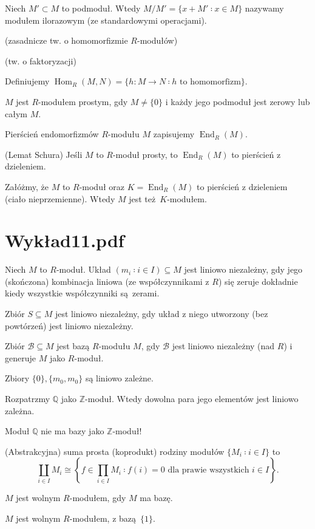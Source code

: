\documentclass[a4paper, 12pt]{article}
\DeclareMathOperator{\Hom}{Hom}
\DeclareMathOperator{\End}{End}
\newcommand{\+}{\enspace}
\begin{document}
Niech $M' ⊂ M$ to podmoduł.
Wtedy $M/M' = \{ x+M' ∶ x ∈ M \}$ nazywamy modułem ilorazowym
(ze standardowymi operacjami).

(zasadnicze tw. o homomorfizmie $R$-modułów)

(tw. o faktoryzacji)

Definiujemy $\Hom_R(M,N) = \{ h: M → N ∶ h \text{ to homomorfizm} \}$.

$M$ jest $R$-modułem prostym, gdy $M ≠ \{ 0 \}$ i
każdy jego podmoduł jest zerowy lub całym $M$.

Pierścień endomorfizmów $R$-modułu $M$ zapisujemy $\End_R(M)$.

(Lemat Schura)
Jeśli $M$ to $R$-moduł prosty, to $\End_R(M)$ to pierścień z dzieleniem.

Załóżmy, że $M$ to $R$-moduł oraz $K = \End_R(M)$ to pierścień z dzieleniem
(ciało nieprzemienne).
Wtedy $M$ jest też $K$-modułem.

\section*{Wykład11.pdf}
Niech $M$ to $R$-moduł.
Układ $(m_i ∶ i ∈ I) ⊆ M$ jest liniowo niezależny,
gdy jego (skończona) kombinacja liniowa (ze współczynnikami z $R$) się zeruje
dokładnie kiedy wszystkie współczynniki są zerami.

Zbiór $S ⊆ M$ jest liniowo niezależny, gdy
układ z niego utworzony (bez powtórzeń) jest liniowo niezależny.

Zbiór $\mathcal{B} ⊆ M$ jest bazą $R$-modułu $M$, gdy
$\mathcal{B}$ jest liniowo niezależny (nad $R$) i
generuje $M$ jako $R$-moduł.

Zbiory $\{ 0 \}, \{ m_0, m_0 \}$ są liniowo zależne.

Rozpatrzmy $ℚ$ jako $ℤ$-moduł.
Wtedy dowolna para jego elementów jest liniowo zależna.

Moduł $ℚ$ nie ma bazy jako $ℤ$-moduł!

(Abstrakcyjna) suma prosta (koprodukt) rodziny modułów $\{ M_i ∶ i ∈ I \}$
to
$$\coprod_{i ∈ I} M_i ≅
\left\{ f ∈ ∏_{i∈I} M_i ∶ f(i) = 0 \text{ dla prawie wszystkich }i ∈ I \right\}.$$




$M$ jest wolnym $R$-modułem, gdy $M$ ma bazę.

$M$ jest wolnym $R$-modułem, z bazą $\{ 1 \}$.
\end{document}
